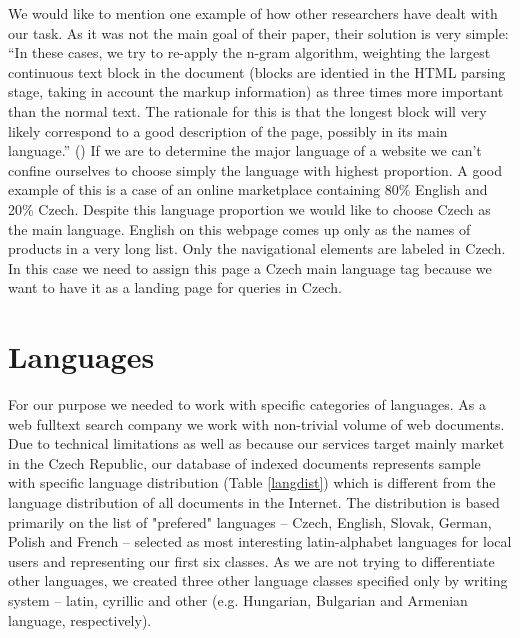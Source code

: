 \documentclass{acm_proc_article-sp}
\begin{document}
  
  We would like to mention one example of how other researchers have dealt with our task. As it was not the main goal of 
  their paper, their solution is very simple:
  “In these cases, we try to re-apply the n-gram algorithm, weighting the largest continuous text block in the document 
  (blocks are identied in the HTML parsing stage, taking in account the markup information) as three times more important 
  than the normal text. The rationale for this is that the longest block will very likely correspond to a good description 
  of the page, possibly in its main language.” (\cite{Martins:langidentweb}) If we are to determine the major language of a website 
  we can’t confine ourselves to choose simply the language with highest proportion. A good example of this is a case of an online marketplace
  containing 80\% English and 20\% Czech. Despite this language proportion we would like to choose Czech as the main language. 
  English on this webpage comes up only as the names of products in a very long list. Only the navigational elements are labeled in Czech. In this case 
  we need to assign this page a Czech main language tag because we want to have it as a landing page for queries in Czech.

\section{Languages}

  For our purpose we needed to work with specific categories of languages.
  As a web fulltext search company we work with non-trivial volume of web documents.
  Due to technical limitations as well as because our services target mainly market in the Czech Republic,
  our database of indexed documents represents sample with specific language distribution (Table \ref{langdist}) which is different from the
  language distribution of all documents in the Internet.
  The distribution is based primarily on the list of "prefered" languages –
  Czech, English, Slovak, German, Polish and French –
  selected as most interesting latin-alphabet languages for local users and representing  our first six classes.
  As we are not trying to differentiate other languages, we created three other language classes specified only by writing system
  – latin, cyrillic and other (e.g. Hungarian, Bulgarian and Armenian language, respectively).
\end{document}
